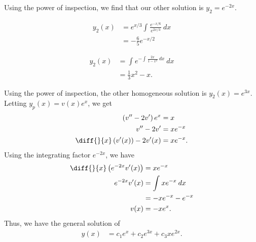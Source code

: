 \documentclass[10pt]{mypackage}
\begin{document}
\begin{solution}[Problem 2]
  Using the power of inspection, we find that our other solution is $y_2 = e^{-2x}$.
\end{solution}
\begin{solution}[Problem 8]
  \begin{align*}
    y_2(x) &= e^{x/3}\int_{}^{} \frac{e^{-x/6}}{e^{2x/3}}\:dx\\
           &= -\frac{6}{5}e^{-x/2}
  \end{align*}
\end{solution}
\begin{solution}[Problem 16]
  \begin{align*}
    y_2(x) &= \int_{}^{} e^{-\int_{}^{} \frac{2x}{1-x^2}\:dx}\:dx\\
           &= \frac{1}{3}x^2 - x.
  \end{align*}
\end{solution}
\begin{solution}[Problem 20]
  Using the power of inspection, the other homogeneous solution is $y_2(x) = e^{3x}$. Letting $y_p(x) = v(x)e^{x}$, we get
  \begin{align*}
    \left(v'' - 2v'\right)e^{x} &= x\\
    v''-2v' &= xe^{-x}\\
    \diff{}{x}\left(v'(x)\right) - 2v'(x) &= xe^{-x}.
  \end{align*}
  Using the integrating factor $e^{-2x}$, we have
  \begin{align*}
    \diff{}{x}\left(e^{-2x}v'(x)\right) &= xe^{-x}\\
    e^{-2x}v'(x) &= \int_{}^{} xe^{-x}\:dx\\
                 &= -xe^{-x} - e^{-x}\\
    v(x) &= -xe^{x}.
  \end{align*}
  Thus, we have the general solution of
  \begin{align*}
    y(x) &= c_1e^{x} + c_2e^{3x} + c_3xe^{2x}.
  \end{align*}
\end{solution}
\end{document}
